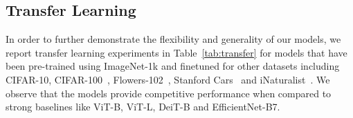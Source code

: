 \begin{table}[htb]
    \caption{\footnotesize \textbf{ImageNet-1k top-1 accuracy of \ours} for additional combinations of image and patch sizes.\vspace*{3pt}
    }
    \centering
     \label{tab:xct_models_details}
\end{table}


\subsection{Transfer Learning}

 In order to further demonstrate the flexibility and generality of our models, we report transfer learning experiments in Table~\ref{tab:transfer} for models that have been pre-trained using ImageNet-1k and finetuned for other datasets including CIFAR-10, CIFAR-100~\cite{Krizhevsky2009LearningML}, Flowers-102~\cite{Nilsback08}, Stanford Cars~\cite{Cars2013} and iNaturalist~\cite{Horn2019INaturalist}.  We observe that the \ours models provide competitive performance when compared to strong baselines like ViT-B, ViT-L, DeiT-B and EfficientNet-B7.

